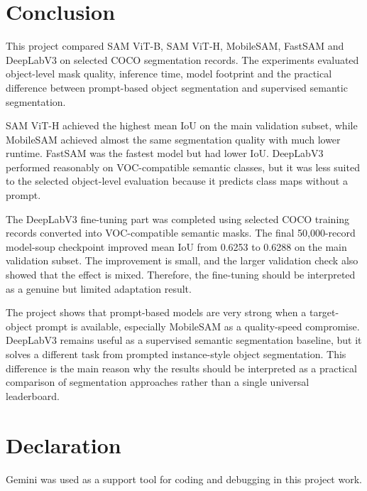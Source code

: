 \documentclass[9pt,a4paper,oneside]{rho-class/rho}
\begin{document}
\section{Conclusion}

    This project compared SAM ViT-B, SAM ViT-H, MobileSAM, FastSAM and DeepLabV3 on selected COCO segmentation records. The experiments evaluated object-level mask quality, inference time, model footprint and the practical difference between prompt-based object segmentation and supervised semantic segmentation.

    SAM ViT-H achieved the highest mean IoU on the main validation subset, while MobileSAM achieved almost the same segmentation quality with much lower runtime. FastSAM was the fastest model but had lower IoU. DeepLabV3 performed reasonably on VOC-compatible semantic classes, but it was less suited to the selected object-level evaluation because it predicts class maps without a prompt.

    The DeepLabV3 fine-tuning part was completed using selected COCO training records converted into VOC-compatible semantic masks. The final 50,000-record model-soup checkpoint improved mean IoU from 0.6253 to 0.6288 on the main validation subset. The improvement is small, and the larger validation check also showed that the effect is mixed. Therefore, the fine-tuning should be interpreted as a genuine but limited adaptation result.

    The project shows that prompt-based models are very strong when a target-object prompt is available, especially MobileSAM as a quality-speed compromise. DeepLabV3 remains useful as a supervised semantic segmentation baseline, but it solves a different task from prompted instance-style object segmentation. This difference is the main reason why the results should be interpreted as a practical comparison of segmentation approaches rather than a single universal leaderboard.


\section{Declaration}

    Gemini \cite{google2025gemini} was used as a support tool for coding and debugging in this project work.


\printbibliography

\end{document}
